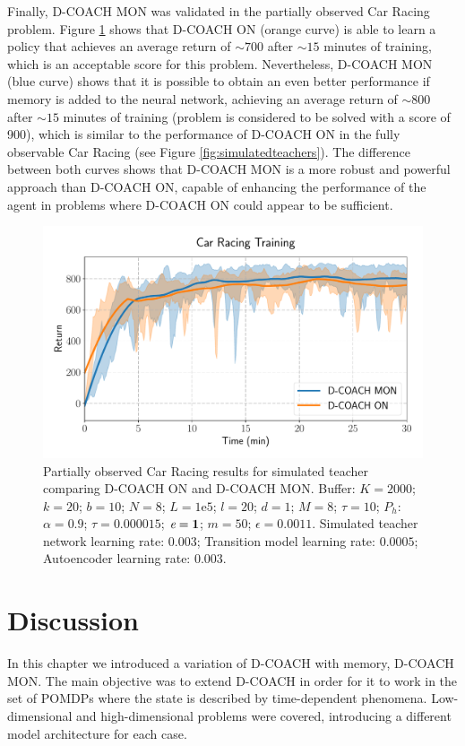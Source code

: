 Finally, D-COACH MON was validated in the partially observed Car Racing problem. Figure \ref{fig:po_cr} shows that D-COACH ON (orange curve) is able to learn a policy that achieves an average return of $\sim700$ after $\sim15$ minutes of training, which is an acceptable score for this problem. Nevertheless, D-COACH MON (blue curve) shows that it is possible to obtain an even better performance if memory is added to the neural network, achieving an average return of $\sim800$ after $\sim15$ minutes of training (problem is considered to be solved with a score of 900), which is similar to the performance of $\text{D-COACH}$ ON in the fully observable Car Racing (see Figure \ref{fig:simulatedteachers}). The difference between both curves shows that D-COACH MON is a more robust and powerful approach than $\text{D-COACH}$ ON, capable of enhancing the performance of the agent in problems where $\text{D-COACH}$ ON could appear to be sufficient.

\begin{figure}[H]
    \centering
    \includegraphics[width=0.7\linewidth]{imagenes/cap3/car_racing_lstm.pdf}
    \caption[Partially observed Car Racing results for simulated teacher comparing D-COACH ON and D-COACH MON.]{Partially observed Car Racing results for simulated teacher comparing D-COACH ON and D-COACH MON.  Buffer: $K = 2000$; $k=20$; $b=10$; $N = 8$; $L=1\mathrm{e}5$; $l=20$; $d=1$; $M=8$; $\tau=10$; $P_{h}$: $\alpha = 0.9$; $\tau = 0.000015$; $\emph{e}=\textbf{1}$; $m=50$; $\epsilon=0.0011$. Simulated teacher network learning rate: $0.003$; Transition model learning rate: $0.0005$; Autoencoder learning rate: $0.003$.}
    \label{fig:po_cr}
\end{figure}

\section{Discussion}
In this chapter we introduced a variation of D-COACH with memory, D-COACH MON. The main objective was to extend D-COACH in order for it to work in the set of POMDPs where the state is described by time-dependent phenomena. Low-dimensional and high-dimensional problems were covered, introducing a different model architecture for each case. 


